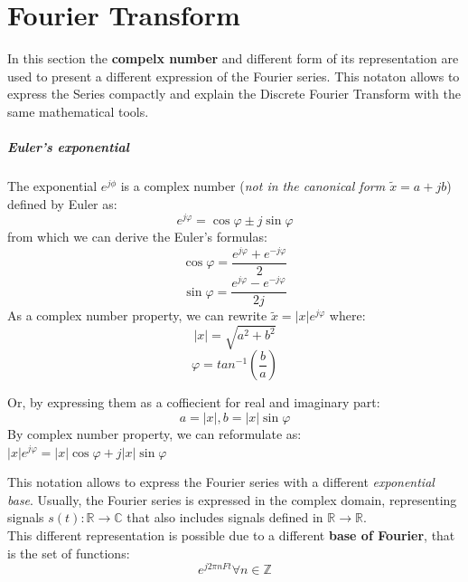 \documentclass[10pt,a4paper]{report}
\theoremstyle{definition}
\begin{document}
\section{Fourier Transform}
In this section the \textbf{compelx number} and different form of its representation are used to present a different expression of the Fourier series. This notaton allows to express the Series compactly and explain the Discrete Fourier Transform with the same mathematical tools.

\subparagraph{Euler's exponential}
The exponential $e^{j\phi}$ is a complex number (\textit{not in the canonical form $\tilde{x} = a+jb$}) defined by Euler as:
\begin{equation}
	e^{j\varphi} =  \cos{\varphi} \pm j\sin{\varphi}
\end{equation}
from which we can derive the Euler's formulas:
\begin{equation}
	\cos{\varphi} = \frac{e^{j\varphi} + e^{-j\varphi}}{2}
\end{equation}
\begin{equation}
	\sin{\varphi} = \frac{e^{j\varphi} - e^{-j\varphi}}{2j}
\end{equation}
As a complex number property, we can rewrite $\tilde{x} = |x|e^{j\varphi}$ where:
\begin{equation}
	|x| =  \sqrt{a^{2}+b^{2}}
\end{equation}
\begin{equation}
	\varphi = tan^{-1}(\frac{b}{a})
\end{equation}

Or, by expressing them as a coffiecient for real and imaginary part:
\begin{equation}
	a = |x|, b = |x|\sin{\varphi}
\end{equation}
By complex number property, we can reformulate as:
$|x|e^{j\varphi} = |x|\cos{\varphi} + j|x|\sin{\varphi}$

This notation allows to express the Fourier series with a different \textit{exponential base}. Usually, the Fourier series is expressed in the complex domain, representing signals $s(t): \mathbb{R} \rightarrow \mathbb{C}$ that also includes signals defined in $\mathbb{
R} \rightarrow \mathbb{R}$. \\
This different representation is possible due to a different \textbf{base of Fourier}, that is the set of functions:
\begin{equation}
	e^{j2\pi nFt} \forall n \in \mathbb{Z}
\end{equation}
\end{document}
